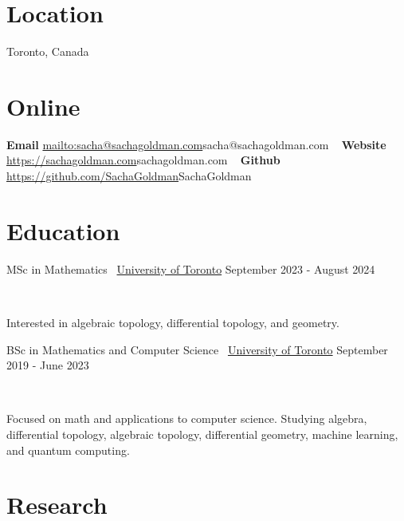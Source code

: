 \documentclass[]{style}
\begin{document}

\begin{aside}
\section{Location}
Toronto, Canada
\section{Online}
\textbf{Email}
\url{mailto:sacha@sachagoldman.com}{sacha@sachagoldman.com} 
~ \vspace{-2mm}
\textbf{Website} 
\url{https://sachagoldman.com}{sachagoldman.com} 
~ \vspace{-2mm}
\textbf{Github}
\url{https://github.com/SachaGoldman}{SachaGoldman}
\end{aside}

\section{Education}

\begin{entrylist}

\vspace{1mm}

\entry
{MSc in Mathematics \ {\normalfont \underline{University of Toronto}}}
{September 2023 - August 2024}
{  ~ \vspace{-2.5mm}

Interested in algebraic topology, differential topology, and geometry. 
}

\entry
{BSc in Mathematics and Computer Science \ {\normalfont \underline{University of Toronto}}}
{September 2019 - June 2023}
{ ~ \vspace{-2.5mm}

Focused on math and applications to computer science. Studying algebra, differential topology, algebraic topology, differential geometry, machine learning, and quantum computing.
}

\end{entrylist}

\section{Research}
\end{document}
